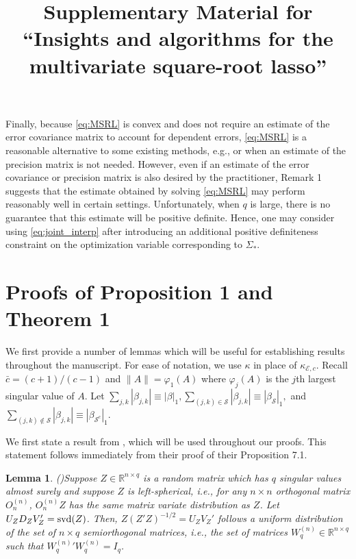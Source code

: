 \documentclass[12pt]{article}
\newtheorem{lemma}{Lemma}
\begin{document}
Finally, because \eqref{eq:MSRL} is convex and does not require an estimate of the error covariance matrix to account for dependent errors, \eqref{eq:MSRL} is a reasonable alternative to some existing methods, e.g., \citet{rothman2010sparse} or \citet{yin2011sparse} when an estimate of the precision matrix is not needed. However, even if an estimate of the error covariance or precision matrix is also desired by the practitioner, Remark 1 suggests that the estimate obtained by solving \eqref{eq:MSRL} may perform reasonably well in certain settings. Unfortunately, when $q$ is large, there is no guarantee that this estimate will be positive definite. Hence, one may consider using \eqref{eq:joint_interp} after introducing an additional positive definiteness constraint on the optimization variable corresponding to $\Sigma_*$. 






\clearpage

\setcounter{page}{1}
\setcounter{section}{0}

\title{Supplementary Material for ``Insights and algorithms for the multivariate square-root lasso''}

\maketitle%
\section{Proofs of Proposition 1 and Theorem 1}
We first provide a number of lemmas which will be useful for establishing results throughout the manuscript. For ease of notation, we use $\kappa$ in place of $\kappa_{\mathcal{E}, c}.$ Recall $\bar{c} = (c+1)/(c-1)$ and $\|A\| = \varphi_1(A)$ where $\varphi_j(A)$ is the $j$th largest singular value of $A$. Let $\sum_{j,k}|\beta_{j,k}| \equiv |\beta|_1, \sum_{(j,k) \in \mathcal{S}}|\beta_{j,k}| \equiv |\beta_{\mathcal{S}}|_1,$ and $\sum_{(j,k) \notin \mathcal{S}}|\beta_{j,k}| \equiv |\beta_{\mathcal{S}^c}|_1$. 

We first state a result from \citet{eaton}, which will be used throughout our proofs. This statement follows immediately from their proof of their Proposition 7.1. 
\begin{lemma}(\citet{eaton})\label{lemma:eaton}
Suppose $Z \in \mathbb{R}^{n \times q}$ is a random matrix which has $q$ singular values almost surely and suppose $Z$ is left-spherical, i.e., for any $n \times n$ orthogonal matrix $O_n^{(n)}$, $O_n^{(n)} Z$ has the same matrix variate distribution as $Z$. Let $U_Z D_Z V_Z' = {\rm svd}(Z)$. Then, $Z(Z'Z)^{-1/2}  = U_Z V_Z'$ follows a uniform distribution of the set of $n \times q$ semiorthogonal matrices, i.e., the set of matrices $W_q^{(n)} \in \mathbb{R}^{n \times q}$ such that ${W_q^{(n)}}'W_q^{(n)} = I_q$.
\end{lemma}
\end{document}
